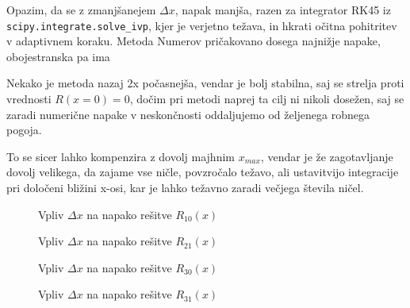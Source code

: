 Opazim, da se z zmanjšanejem $\Delta x$, napak manjša, razen za integrator RK45 iz \\\texttt{scipy.integrate.solve\_ivp}, kjer je verjetno težava, in hkrati očitna pohitritev v adaptivnem koraku. Metoda Numerov pričakovano dosega najnižje napake, obojestranska pa ima 

Nekako je metoda nazaj 2x počasnejša, vendar je bolj stabilna, saj se strelja proti vrednosti $R(x=0)=0$, dočim pri metodi naprej ta cilj ni nikoli dosežen, saj se zaradi numerične napake v neskončnosti oddaljujemo od željenega robnega pogoja.

To se sicer lahko kompenzira z dovolj majhnim $x_{max}$, vendar je že zagotavljanje dovolj velikega, da zajame vse ničle, povzročalo težavo, ali ustavitvijo integracije pri določeni bližini x-osi, kar je lahko težavno zaradi večjega števila ničel.

\begin{figure}[H]
    \centering
    \caption{Vpliv $\Delta x$ na napako rešitve $R_{10}(x)$}
\end{figure}

\begin{figure}[H]
    \centering
    \caption{Vpliv $\Delta x$ na napako rešitve $R_{21}(x)$}
\end{figure}

\begin{figure}[H]
    \centering
    \caption{Vpliv $\Delta x$ na napako rešitve $R_{30}(x)$}
\end{figure}

\begin{figure}[H]
    \centering
    \caption{Vpliv $\Delta x$ na napako rešitve $R_{31}(x)$}
\end{figure}

